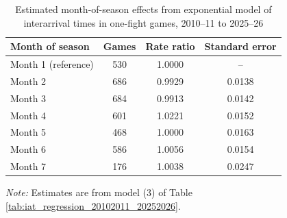 \begin{table}[!h]
\centering
\caption{Estimated month-of-season effects from exponential model of interarrival times in one-fight games, 2010--11 to 2025--26}
\label{tab:month_effects_20102011_20252026}
\small
\renewcommand{\arraystretch}{1.12}
\setlength{\tabcolsep}{6pt}

\begin{tabular*}{0.75\textwidth}{@{\extracolsep{\fill}}lccc}
\toprule
Month of season & Games & Rate ratio & Standard error \\
\midrule
Month 1 (reference) & 530 & 1.0000 & -- \\
Month 2 & 686 & 0.9929 & 0.0138 \\
Month 3 & 684 & 0.9913 & 0.0142 \\
Month 4 & 601 & 1.0221 & 0.0152 \\
Month 5 & 468 & 1.0000 & 0.0163 \\
Month 6 & 586 & 1.0056 & 0.0154 \\
Month 7 & 176 & 1.0038 & 0.0247 \\
\bottomrule
\end{tabular*}

\vspace{0.4em}
\parbox{0.75\textwidth}{
\footnotesize
\textit{Note:} Estimates are from model (3) of Table \ref{tab:iat_regression_20102011_20252026}.
}
\end{table}
